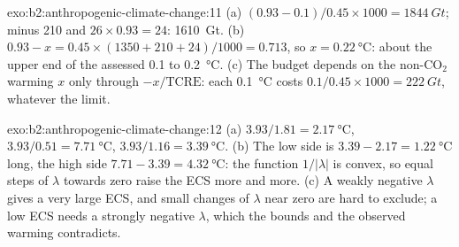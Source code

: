 \begin{solution}{exo:b2:anthropogenic-climate-change:11}
(a) $(0.93 - 0.1)/0.45 \times 1000 = \qty{1844}{Gt}$; minus 210 and $26 \times 0.93 = 24$:
\qty{1610}{Gt}. (b) $0.93 - x = 0.45 \times (1350 + 210 + 24)/1000 = 0.713$, so $x =
\qty{0.22}{\celsius}$: about the upper end of the assessed 0.1 to \qty{0.2}{\celsius}. (c) The
budget depends on the non-CO$_2$ warming $x$ only through $-x/\text{TCRE}$: each
\qty{0.1}{\celsius} costs $0.1/0.45 \times 1000 = \qty{222}{Gt}$, whatever the limit.
\end{solution}

\begin{solution}{exo:b2:anthropogenic-climate-change:12}
(a) $3.93/1.81 = \qty{2.17}{\celsius}$, $3.93/0.51 = \qty{7.71}{\celsius}$, $3.93/1.16 =
\qty{3.39}{\celsius}$. (b) The low side is $3.39 - 2.17 = \qty{1.22}{\celsius}$ long, the high side
$7.71 - 3.39 = \qty{4.32}{\celsius}$: the function $1/|\lambda|$ is convex, so equal steps of
$\lambda$ towards zero raise the ECS more and more. (c) A weakly negative $\lambda$ gives a very
large ECS, and small changes of $\lambda$ near zero are hard to exclude; a low ECS needs a strongly
negative $\lambda$, which the  bounds and the observed warming contradicts.
\end{solution}

